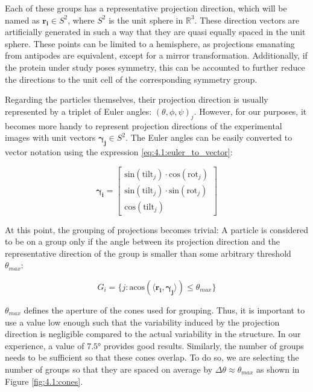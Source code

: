 \documentclass[../main.tex]{subfiles}
\begin{document}
Each of these groups has a representative projection direction, which will be named as $\bm{r_i} \in S^2$, where $S^2$ is the unit sphere in $\mathbb{R}^3$. These direction vectors are artificially generated in such a way that they are quasi equally spaced in the unit sphere. These points can be limited to a hemisphere, as projections emanating from antipodes are equivalent, except for a mirror transformation. Additionally, if the protein under study poses symmetry, this can be accounted to further reduce the directions to the unit cell of the corresponding symmetry group.

Regarding the particles themselves, their projection direction is usually represented by a triplet of Euler angles: $(\theta, \phi, \psi)_j$. However, for our purposes, it becomes more handy to represent projection directions of the experimental images with unit vectors $\bm{\gamma_j} \in S^2$. The Euler angles can be easily converted to vector notation using the expression \eqref{eq:4.1:euler_to_vector}:

\begin{equation}\label{eq:4.1:euler_to_vector}
    \bm{\gamma_i} =
    \begin{bmatrix}
        \text{sin}(\text{tilt}_j) \cdot \text{cos}(\text{rot}_j) \\ 
        \text{sin}(\text{tilt}_j) \cdot \text{sin}(\text{rot}_j) \\ 
        \text{cos}(\text{tilt}_j)
    \end{bmatrix}
\end{equation}

At this point, the grouping of projections becomes trivial: A particle is considered to be on a group only if the angle between its projection direction and the representative direction of the group is smaller than some arbitrary threshold $\theta_{max}$:

\begin{equation}
    G_i = \{ j : \text{acos}(\langle \bm{r_i}, \bm{\gamma_j} \rangle) \leq \theta_{max} \}
\end{equation}

$\theta_{max}$ defines the aperture of the cones used for grouping. Thus, it is important to use a value low enough such that the variability induced by the projection direction is negligible compared to the actual variability in the structure. In our experience, a value of $7.5 \si{\degree}$ provides good results. Similarly, the number of groups needs to be sufficient so that these cones overlap. To do so, we are selecting the number of groups so that they are spaced on average by $\Delta\theta \approx \theta_{max}$ as shown in Figure \ref{fig:4.1:cones}. 
\end{document}
